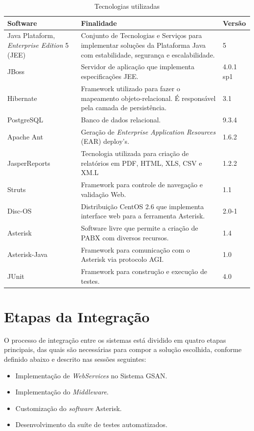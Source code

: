 \begin{table}[H]
	\center
	\footnotesize
	\caption{Tecnologias utilizadas}
	\label{tabela:tecnologiasUtilizadas}
	\begin{tabular}{|p{4cm}|p{7cm}|p{2cm}|}
		\hline
		\textbf{Software} & \textbf{Finalidade} & \textbf{Versão} \\
		\hline
		Java Plataform, \textit{Enterprise Edition} 5 (JEE) & Conjunto de Tecnologias e Serviços para implementar soluções da Plataforma Java com estabilidade, segurança e escalabilidade. & 5 \\
		\hline
		JBoss 				& Servidor de aplicação que implementa especificações JEE. 								& 4.0.1 sp1 \\
		\hline
		Hibernate 			& Framework utilizado para fazer o mapeamento objeto-relacional. É responsável pela camada de persistência. & 3.1 \\
		\hline
		PostgreSQL 			& Banco de dados relacional. 															& 9.3.4 \\
		\hline
		Apache Ant 			& Geração de \textit{Enterprise Application Resources} (EAR) deploy’s. 					& 1.6.2 \\
		\hline
		JasperReports 		& Tecnologia utilizada para criação de relatórios em PDF, HTML, XLS, CSV e XM.L 		& 1.2.2 \\
		\hline
		Struts 				& Framework para controle de navegação e validação Web. 								& 1.1	 \\
		\hline
		Disc-OS 			& Distribuição CentOS 2.6 que implementa interface web para a ferramenta Asterisk. 		& 2.0-1 \\
		\hline
		Asterisk 			& Software livre que permite a criação de PABX com diversos recursos. 					& 1.4 \\		
		\hline
		Asterisk-Java 		& Framework para comunicação com o Asterisk via protocolo AGI. 							& 1.0 \\
		\hline
		JUnit		 		& Framework para construção e execução de testes. 										& 4.0 \\		
		\hline			
	\end{tabular}
\end{table}



\section{Etapas da Integração}
O processo de integração entre os sistemas está dividido em quatro etapas principais, das quais são necessárias para compor a solução escolhida, conforme definido abaixo e descrito nas sessões seguintes:

\begin{itemize}
	\item Implementação de \textit{WebServices} no Sistema GSAN. 
	\item Implementação do \textit{Middleware}.
	\item Customização do \textit{software} Asterisk.
	\item Desenvolvimento da suíte de testes automatizados.
\end{itemize}

